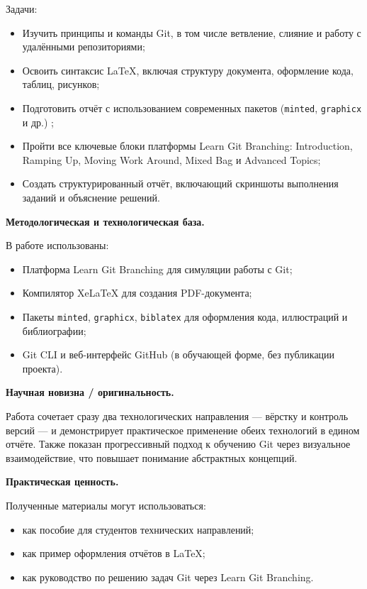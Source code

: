 \documentclass[a4paper,12pt]{report}
\begin{document}
Задачи:
\begin{itemize}
  \item Изучить принципы и команды Git, в том числе ветвление, слияние и работу с удалёнными репозиториями;
  \item Освоить синтаксис \LaTeX{}, включая структуру документа, оформление кода, таблиц, рисунков;
  \item Подготовить отчёт с использованием современных пакетов (\texttt{minted}, \texttt{graphicx} и др.) \cite{latex_minted};
  \item Пройти все ключевые блоки платформы Learn Git Branching: Introduction, Ramping Up, Moving Work Around, Mixed Bag и Advanced Topics;
  \item Создать структурированный отчёт, включающий скриншоты выполнения заданий и объяснение решений.
\end{itemize}

\textbf{Методологическая и технологическая база.}

В работе использованы:
\begin{itemize}
  \item Платформа Learn Git Branching \cite{learngitbranching} для симуляции работы с Git;
  \item Компилятор XeLaTeX для создания PDF-документа;
  \item Пакеты \texttt{minted}, \texttt{graphicx}, \texttt{biblatex} для оформления кода, иллюстраций и библиографии;
  \item Git CLI и веб-интерфейс GitHub (в обучающей форме, без публикации проекта).
\end{itemize}

\textbf{Научная новизна / оригинальность.}

Работа сочетает сразу два технологических направления — вёрстку и контроль версий — и демонстрирует практическое применение обеих технологий в едином отчёте. Также показан прогрессивный подход к обучению Git через визуальное взаимодействие, что повышает понимание абстрактных концепций.

\textbf{Практическая ценность.}

Полученные материалы могут использоваться:
\begin{itemize}
  \item как пособие для студентов технических направлений;
  \item как пример оформления отчётов в \LaTeX{};
  \item как руководство по решению задач Git через Learn Git Branching.
\end{itemize}
\end{document}
